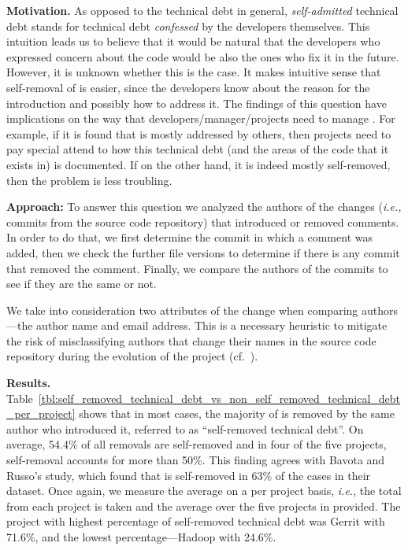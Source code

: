 \noindent\textbf{Motivation.} As opposed to the technical debt in general, \emph{self-admitted} technical debt stands for technical debt \emph{confessed} by the developers themselves. This intuition leads us to believe that it would be natural that the developers who expressed concern about the code would be also the ones who fix it in the future. However, it is unknown whether this is the case. It makes intuitive sense that self-removal of \SATD is easier, since the developers know about the reason for the \SATD introduction and possibly how to address it. The findings of this question have implications on the way that developers/manager/projects need to manage \SATD. For example, if it is found that \SATD is mostly addressed by others, then projects need to pay special attend to how this technical debt (and the areas of the code that it exists in) is documented. If on the other hand, it is indeed mostly self-removed, then the problem is less troubling.



\noindent\textbf{Approach:} To answer this question we analyzed the authors of the changes (\textit{i.e.,} commits from the source code repository) that introduced or removed \SATD comments. In order to do that, we first determine the commit in which a \SATD comment was added, then we check the further file versions to determine if there is any commit that removed the \SATD comment. Finally, we compare the authors of the commits to see if they are the same or not. 

We take into consideration two attributes of the change when comparing authors---the author name and email address. This is a necessary heuristic to mitigate the risk of misclassifying authors that change their names in the source code repository during the evolution of the project (cf.\ \cite{DBLP:conf/icsm/KoutersVSB12,wiese2016mailing}).


\noindent\textbf{Results.} Table~\ref{tbl:self_removed_technical_debt_vs_non_self_removed_technical_debt_per_project} shows that in most cases, the majority of \SATD is removed by the same author who introduced it, referred to as ``self-removed technical debt''. On average, 54.4\% of all removals are self-removed and in four of the five projects, self-removal accounts for more than 50\%.  This finding agrees with Bavota and Russo's study, which found that \SATD is self-removed in 63\% of the cases in their dataset. Once again, we measure the average on a per project basis, \emph{i.e.}, the total from each project is taken and the average over the five projects in provided. The project with highest percentage of self-removed technical debt was Gerrit with 71.6\%, and the lowest percentage---Hadoop with 24.6\%. 

